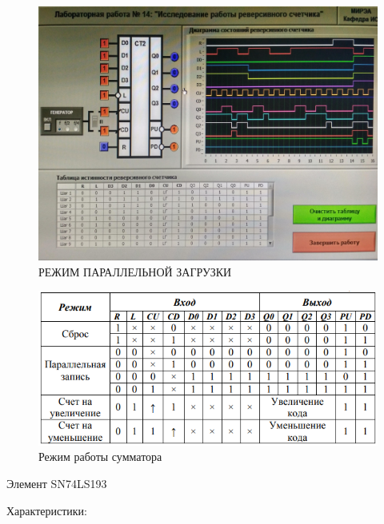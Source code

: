 \begin{figure}[H]
	\centering
	\includegraphics[width=0.95\linewidth]{imgs/14/3.jpg}
	\caption{РЕЖИМ ПАРАЛЛЕЛЬНОЙ ЗАГРУЗКИ}
	\label{fig:14_3}
\end{figure}

\begin{figure}[H]
	\centering
	\includegraphics[width=0.85\linewidth]{imgs/14/14_tab}
	\caption{Режим работы сумматора}
	\label{fig:14_tab}
\end{figure}

Элемент SN74LS193 

Характеристики:

